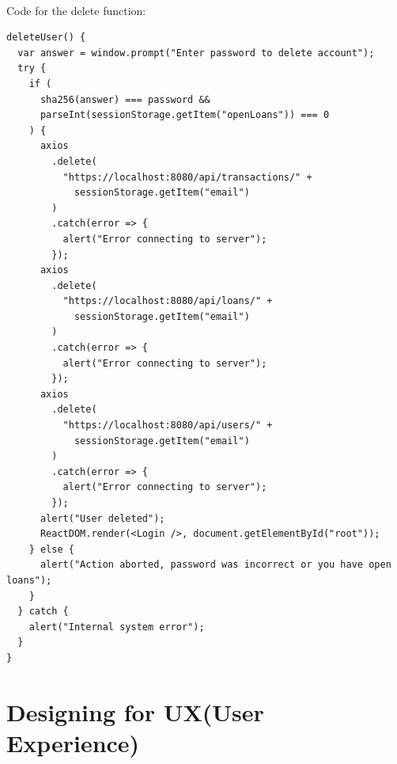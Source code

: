 \\
Code for the delete function:
\begin{verbatim}
deleteUser() {
  var answer = window.prompt("Enter password to delete account");
  try {
    if (
      sha256(answer) === password &&
      parseInt(sessionStorage.getItem("openLoans")) === 0
    ) {
      axios
        .delete(
          "https://localhost:8080/api/transactions/" +
            sessionStorage.getItem("email")
        )
        .catch(error => {
          alert("Error connecting to server");
        });
      axios
        .delete(
          "https://localhost:8080/api/loans/" +
            sessionStorage.getItem("email")
        )
        .catch(error => {
          alert("Error connecting to server");
        });
      axios
        .delete(
          "https://localhost:8080/api/users/" +
            sessionStorage.getItem("email")
        )
        .catch(error => {
          alert("Error connecting to server");
        });
      alert("User deleted");
      ReactDOM.render(<Login />, document.getElementById("root"));
    } else {
      alert("Action aborted, password was incorrect or you have open loans");
    }
  } catch {
    alert("Internal system error");
  }
}
\end{verbatim}
\section{Designing for UX(User Experience)}
